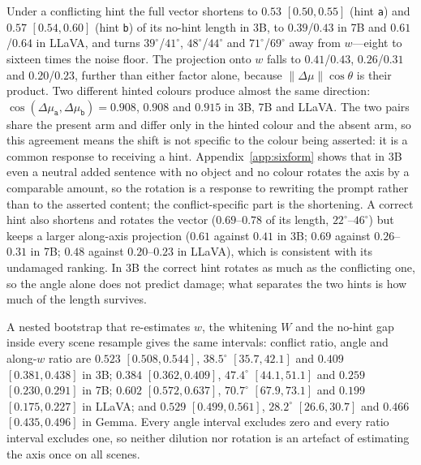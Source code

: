 \documentclass[10pt]{article}
\newcommand{\wdir}{w}
\begin{document}
Under a conflicting hint the full vector shortens to $0.53$ $[0.50,0.55]$ (hint \texttt{a}) and $0.57$ $[0.54,0.60]$ (hint \texttt{b}) of its no-hint length in 3B, to $0.39$/$0.43$ in 7B and $0.61$/$0.64$ in LLaVA, and turns $39^\circ$/$41^\circ$, $48^\circ$/$44^\circ$ and $71^\circ$/$69^\circ$ away from $\wdir$---eight to sixteen times the noise floor. The projection onto $\wdir$ falls to $0.41$/$0.43$, $0.26$/$0.31$ and $0.20$/$0.23$, further than either factor alone, because $\|\Delta\mu\|\cos\theta$ is their product. Two different hinted colours produce almost the same direction: $\cos(\Delta\mu_{\texttt{a}},\Delta\mu_{\texttt{b}})=0.908$, $0.908$ and $0.915$ in 3B, 7B and LLaVA. The two pairs share the present arm and differ only in the hinted colour and the absent arm, so this agreement means the shift is not specific to the colour being asserted: it is a common response to receiving a hint. Appendix~\ref{app:sixform} shows that in 3B even a neutral added sentence with no object and no colour rotates the axis by a comparable amount, so the rotation is a response to rewriting the prompt rather than to the asserted content; the conflict-specific part is the shortening. A correct hint also shortens and rotates the vector ($0.69$--$0.78$ of its length, $22^\circ$--$46^\circ$) but keeps a larger along-axis projection ($0.61$ against $0.41$ in 3B; $0.69$ against $0.26$--$0.31$ in 7B; $0.48$ against $0.20$--$0.23$ in LLaVA), which is consistent with its undamaged ranking. In 3B the correct hint rotates as much as the conflicting one, so the angle alone does not predict damage; what separates the two hints is how much of the length survives.

A nested bootstrap that re-estimates $\wdir$, the whitening $W$ and the no-hint gap inside every scene resample gives the same intervals: conflict ratio, angle and along-$\wdir$ ratio are $0.523$ $[0.508,0.544]$, $38.5^\circ$ $[35.7,42.1]$ and $0.409$ $[0.381,0.438]$ in 3B; $0.384$ $[0.362,0.409]$, $47.4^\circ$ $[44.1,51.1]$ and $0.259$ $[0.230,0.291]$ in 7B; $0.602$ $[0.572,0.637]$, $70.7^\circ$ $[67.9,73.1]$ and $0.199$ $[0.175,0.227]$ in LLaVA; and $0.529$ $[0.499,0.561]$, $28.2^\circ$ $[26.6,30.7]$ and $0.466$ $[0.435,0.496]$ in Gemma. Every angle interval excludes zero and every ratio interval excludes one, so neither dilution nor rotation is an artefact of estimating the axis once on all scenes.
\end{document}
